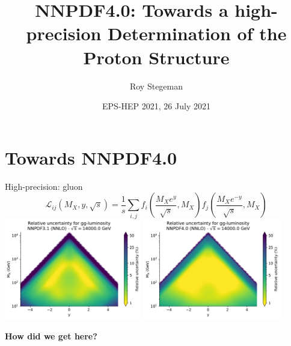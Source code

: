 \documentclass[aspectratio=169,9pt]{beamer}
\title{NNPDF4.0: Towards a high-precision Determination of the Proton Structure}
\date{EPS-HEP 2021, 26 July 2021}
\author{Roy Stegeman}
\institute{University of Milan and INFN Milan}
\begin{document}
{
\begin{frame}
  \titlepage
\end{frame}
}



\section*{Towards NNPDF4.0}



%    

\begin{frame}[t]{High-precision: gluon}
	\begin{equation*}
	\mathcal{L}_{i j}\left(M_{X}, y, \sqrt{s}\right)
	=\frac{1}{s} \sum_{i, j} f_{i}\left(\frac{M_{X} e^{y}}{\sqrt{s}}, M_{X}\right) f_{j}\left(\frac{M_{X} e^{-y}}{\sqrt{s}}, M_{X}\right)
	\end{equation*}
	\includegraphics[width=0.45\textwidth]{plot_lumi2d_uncertainty_NNPDF31_gg}
	\includegraphics[width=0.45\textwidth]{plot_lumi2d_uncertainty_NNPDF40_gg}
    \begin{center}
	    \textbf{How did we get here?}
	\end{center}
\end{frame}
\end{document}
